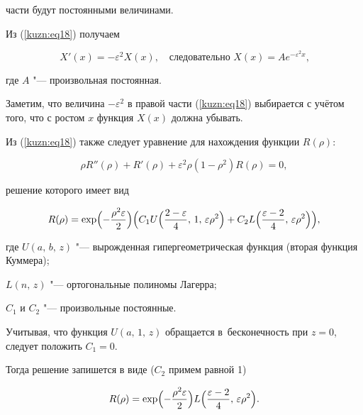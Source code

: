 части будут постоянными величинами.

Из (\ref{kuzn:eq18}) получаем

\begin{equation}

\label{kuzn:eq19}

X'(x)= -\varepsilon^2  X(x),  \quad \text{следовательно $X(x)=Ae^{-\varepsilon^2x}$,}

\end{equation}

где $A$ "--- произвольная постоянная. 

Заметим, что величина $-\varepsilon^2$ в правой части (\ref{kuzn:eq18}) выбирается с учётом того, что с ростом $x$ функция $X(x)$ должна убывать.

Из (\ref{kuzn:eq18}) также следует уравнение для нахождения функции $R(\rho)$:

\begin{equation}

\label{kuzn:eq20}

\rho R''(\rho )+R'(\rho )+\varepsilon^2\rho(1-\rho ^2)R(\rho )=0,

\end{equation}

решение которого имеет вид

$$

R(\rho ) =\exp \Bigl( -\frac{\rho ^2\varepsilon }{2} \Bigr)

\Bigl(C_1 U \Bigl( \frac{2-\varepsilon }{4},\,1,\,\varepsilon \rho^2 \Bigr)+

C_2 L \Bigl( \frac{\varepsilon -2}{4},\,\varepsilon \rho^2 \Bigr)

\Bigr),

$$

где $U(a,\,b,\,z)$ "--- вырожденная гипергеометрическая функция (вторая функция Куммера);

$L(n,\,z)$ "--- ортогональные полиномы Лагерра;

$C_1$ и $C_2$ "--- произвольные постоянные.



Учитывая, что функция $U(a,\,1,\,z)$ обращается в~бесконечность при \mbox{$z = 0$,} следует положить $C_1 = 0$. 

Тогда решение запишется в виде ($C_2$ примем равной 1)

\begin{equation}

\label{kuzn:eq21}

R(\rho) =\exp \Bigl( -\frac{\rho^2\varepsilon }{2} \Bigr)

L\Bigl( \frac{\varepsilon -2}{4},\,\varepsilon \rho ^2\Bigr).

\end{equation}



